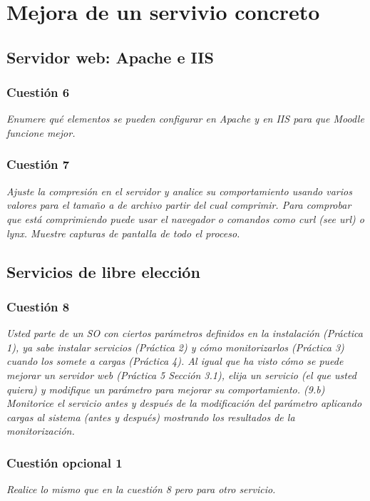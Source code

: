 \section{Mejora de un servivio concreto}
\subsection{Servidor web: Apache e IIS}
\subsubsection{Cuestión 6}
\textit{Enumere qué elementos se pueden configurar en Apache y en IIS para que Moodle funcione mejor.}
\subsubsection{Cuestión 7}
\textit{Ajuste la compresión en el servidor y analice su
comportamiento usando varios valores para el tamaño a de archivo partir del cual comprimir. Para comprobar que está comprimiendo puede usar el navegador o comandos como curl (see url) o lynx. Muestre capturas de pantalla de todo el proceso.}
\subsection{Servicios de libre elección}
\subsubsection{Cuestión 8}
\textit{Usted parte de un SO con ciertos parámetros definidos en la instalación (Práctica 1), ya sabe instalar servicios (Práctica 2) y cómo monitorizarlos (Práctica 3) cuando los somete a cargas (Práctica 4). Al igual que ha visto cómo se puede mejorar un servidor web (Práctica 5 Sección 3.1), elija un servicio (el que usted quiera) y modifique un parámetro para mejorar su comportamiento. (9.b) Monitorice el servicio antes y después de la modificación del parámetro aplicando cargas al sistema (antes y después) mostrando los resultados de la monitorización.}
\subsubsection{Cuestión opcional 1}
\textit{Realice lo mismo que en la cuestión 8 pero para otro servicio.}
\newpage




